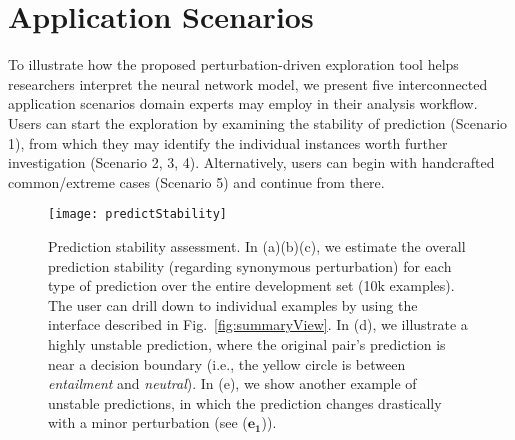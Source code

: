 \section{Application Scenarios}
\label{sec:caseStudy}
To illustrate how the proposed perturbation-driven exploration tool helps researchers interpret the neural network model,
we present five interconnected application scenarios domain experts may employ in their analysis workflow.
Users can start the exploration by examining the stability of prediction (Scenario 1), from which they may identify the individual instances worth further investigation (Scenario 2, 3, 4). Alternatively, users can begin with handcrafted common/extreme cases (Scenario 5) and continue from there.

\begin{figure}[htbp]
\centering
\vspace{-2mm}
 \texttt{[image: predictStability]}
 \vspace{-6mm}
 \caption{
Prediction stability assessment. In (a)(b)(c), we estimate the overall prediction stability (regarding synonymous perturbation) for each type of prediction over the entire development set (10k examples). The user can drill down to individual examples by using the interface described in Fig.~\ref{fig:summaryView}. In (d), we illustrate a highly unstable prediction, where the original pair's prediction is near a decision boundary (i.e., the yellow circle is between \emph{entailment} and \emph{neutral}). In (e), we show another example of unstable predictions, in which the prediction changes drastically with a minor perturbation (see ($\mathbf{e_1}$)). }
\label{fig:predictStability}
\vspace{-3mm}
\end{figure}

